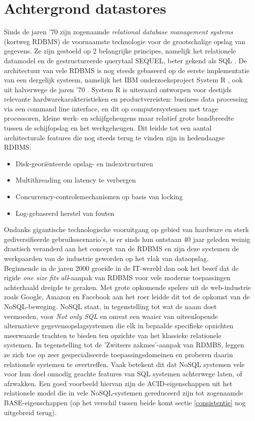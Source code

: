 \chapter{Achtergrond datastores}
\label{datastores_intro}

Sinds de jaren '70 zijn zogenaamde \textit{relational database management systems} (kortweg RDBMS) de voornaamste technologie voor de grootschalige opslag van gegevens. Ze zijn gestoeld op 2 belangrijke principes, namelijk het relationele datamodel \cite{codd1970relational} en de gestructureerde querytaal SEQUEL, beter gekend als SQL \cite{chamberlin1974sequel}. De architectuur van vele RDBMS is nog steeds gebaseerd op de eerste implementatie van een dergelijk systeem, namelijk het IBM onderzoeksproject System R \cite{blasgen1981system}, ook uit halverwege de jaren '70 \cite{Stonebraker:2007:EAE:1325851.1325981}. System R is uiteraard ontworpen voor destijds relevante hardwarekarakteristieken en productvereisten: business data processing via een command line interface, en dit op computersystemen met trage processoren, kleine werk- en schijfgeheugens maar relatief grote bandbreedte tussen de schijfopslag en het werkgeheugen. Dit leidde tot een aantal architecturale features die nog steeds terug te vinden zijn in hedendaagse RDBMS:
\begin{itemize}
\item Disk-geori\"enteerde opslag- en indexstructuren
\item Multithreading om latency te verbergen
\item Concurrency-controlemechanismen op basis van locking
\item Log-gebaseerd herstel van fouten
\end{itemize} 
Ondanks gigantische technologische vooruitgang op gebied van hardware en sterk gediversifieerde gebruiksscenario's, is er sinds hun ontstaan 40 jaar geleden weinig drastisch veranderd aan het concept van de RDBMS en zijn deze systemen de werkpaarden van de industrie geworden op het vlak van dataopslag.\\

Beginnende in de jaren 2000 groeide in de IT-wereld dan ook het besef dat de rigide \textit{one size fits all}-aanpak van RDBMS voor vele moderne toepassingen achterhaald dreigde te geraken. Met grote opkomende spelers uit de web-industrie zoals Google, Amazon en Facebook aan het roer leidde dit tot de opkomst van de NoSQL-beweging. NoSQL staat, in tegenstelling tot wat de naam doet vermoeden, voor \textit{Not only SQL} en omvat een waaier van uiteenlopende alternatieve gegevensopslagsystemen die elk in bepaalde specifieke opzichten meerwaarde trachten te bieden ten opzichte van het klassieke relationele systemen. In tegenstelling tot de 'Zwitsers zakmes'-aanpak van RDMBS, leggen ze zich toe op zeer gespecialiseerde toepassingsdomeinen en proberen daarin relationele systemen te overtreffen. Vaak betekent dit dat NoSQL systemen vele voor hun doel onnodig geachte features van SQL systemen achterwege laten, of afzwakken. Een goed voorbeeld hiervan zijn de ACID-eigenschappen uit het relationele model die in vele NoSQL-systemen gereduceerd zijn tot zogenaamde BASE-eigenschappen (op het verschil tussen beide komt sectie \ref{consistentie} nog uitgebreid terug).

